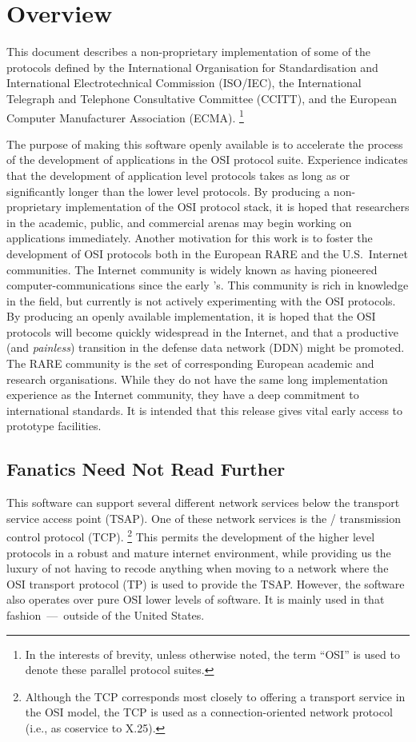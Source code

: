 
\chapter	{Overview}\label{overview}
This document describes a non-proprietary implementation of some of the
protocols defined by the International Organisation for Standardisation
and International Electrotechnical Commission (ISO/IEC),
the International Telegraph and Telephone Consultative Committee (CCITT),
and the European Computer Manufacturer Association (ECMA).%
\footnote{In the interests of brevity,
unless otherwise noted,
the term ``OSI'' is used to denote these parallel protocol suites.}

The purpose of making this software openly available is to
accelerate the process of the development of applications in the OSI
protocol suite.
Experience indicates that the development of application level protocols takes
as long as or significantly longer than the lower level protocols.
By producing a non-proprietary implementation of the OSI protocol stack,
it is hoped that researchers in the academic, public, and commercial arenas
may begin working on applications immediately.
Another motivation for this work is to foster the development of OSI protocols
both in the European RARE and the U.S.~Internet communities.
The Internet community is widely known as having pioneered
computer-communications since the early {}'s.
This community is rich in knowledge in the field,
but currently is not actively experimenting with the OSI protocols.
By producing an openly available implementation,
it is hoped that the OSI protocols will become quickly widespread in the
Internet,
and that a productive (and {\em painless\/}) transition in the defense
data network (DDN) might be promoted.
The RARE community is the set of corresponding European academic and research
organisations.
While they do not have the same long implementation experience as the Internet
community,
they have a deep commitment to international standards.
It is intended that this release gives vital early access to prototype
facilities.

\section	{Fanatics Need Not Read Further}
This software can support several different network services below the
transport service access point (TSAP).
One of these network services
is the \dod/ transmission control protocol (TCP)\cite{TCP}.%
\footnote{Although the TCP corresponds most closely to offering a transport
service in the OSI model,
the TCP is used as a connection-oriented network protocol
(i.e., as coservice to X.25).}
This permits the development of the higher level protocols in a robust and
mature internet environment, while providing us the luxury of not having to
recode anything when moving to a network where the OSI transport protocol (TP)
is used to provide the TSAP.
However, the software also operates over pure OSI lower levels of software.
It is mainly used in that fashion~---~outside of the United States.

